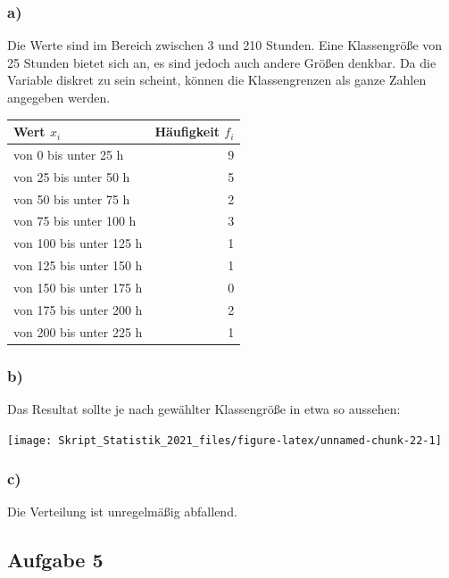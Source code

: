 \documentclass[
  11pt,
  ngerman,
  a4paper,
]{report}
\begin{document}
\hypertarget{a-1}{%
\subsubsection{a)}\label{a-1}}

Die Werte sind im Bereich zwischen 3 und 210 Stunden. Eine Klassengröße von 25 Stunden bietet sich an, es sind jedoch auch andere Größen denkbar. Da die Variable diskret zu sein scheint, können die Klassengrenzen als ganze Zahlen angegeben werden.

\begin{table}[H]
\centering
\begin{tabular}{lr}
\toprule
Wert $x_i$ & Häufigkeit $f_i$\\
\midrule
von 0 bis unter 25 h & 9\\
von 25 bis unter 50 h & 5\\
von 50 bis unter 75 h & 2\\
von 75 bis unter 100 h & 3\\
von 100 bis unter 125 h & 1\\
von 125 bis unter 150 h & 1\\
von 150 bis unter 175 h & 0\\
von 175 bis unter 200 h & 2\\
von 200 bis unter 225 h & 1\\
\bottomrule
\end{tabular}
\end{table}

\hypertarget{b-1}{%
\subsubsection{b)}\label{b-1}}

Das Resultat sollte je nach gewählter Klassengröße in etwa so aussehen:

\begin{center}\texttt{[image: Skript\_Statistik\_2021\_files/figure-latex/unnamed-chunk-22-1]} \end{center}

\hypertarget{c-1}{%
\subsubsection{c)}\label{c-1}}

Die Verteilung ist unregelmäßig abfallend.

\hypertarget{aufgabe-5-1}{%
\subsection{Aufgabe 5}\label{aufgabe-5-1}}
\end{document}
